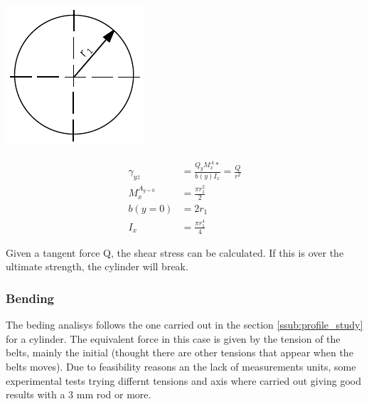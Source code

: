   \noindent\begin{minipage}{0.2\textwidth}%
  \includegraphics[width=\linewidth]{figures/profile_tube.pdf}
  \end{minipage}%
  \hfill%
  \begin{minipage}{0.8\textwidth}
    \begin{equation}
    \begin{aligned}
      \gamma_{yz} &= \frac{Q_y M_{x}^A*}{b(y) I_x} = \frac{Q}{r^2}\\
      M_{x}^{A_{y=0}} &= \frac{\pi r_1^2}{2} \\
      b(y=0) &= 2 r_1 \\
      I_x &= \frac{\pi r_1^4}{4}
      \end{aligned}
    \end{equation}
  \end{minipage}
  Given a tangent force Q, the shear stress can be calculated.
  If this is over the ultimate strength, the cylinder will break.

  \subsubsection{Bending} %
  \label{ssub:bending}
  The beding analisys follows the one carried out in the section \ref{ssub:profile_study} for a cylinder.
  The equivalent force in this case is given by the tension of the belts, mainly the initial (thought there are other tensions that appear when the belts moves).
  Due to feasibility reasons an the lack of measurements units, some experimental tests trying differnt tensions and axis where carried out giving good results with a 3 mm rod or more.


